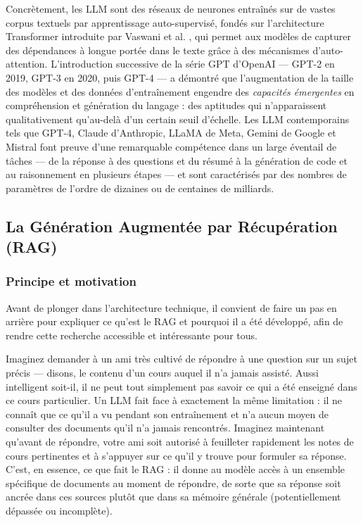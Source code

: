 \documentclass[a4paper,11pt]{article}
\begin{document}
Concrètement, les LLM sont des réseaux de neurones entraînés sur de vastes
corpus textuels par apprentissage auto-supervisé, fondés sur l'architecture
Transformer introduite par Vaswani et al. \cite{vaswani2017attention}, qui
permet aux modèles de capturer des dépendances à longue portée dans le texte
grâce à des mécanismes d'auto-attention. L'introduction successive de la
série GPT d'OpenAI --- GPT-2 en 2019, GPT-3 en 2020, puis GPT-4 ---
a démontré que l'augmentation de la taille des modèles et des données
d'entraînement engendre des \emph{capacités émergentes} en compréhension
et génération du langage \cite{wei2022emergent} : des aptitudes qui
n'apparaissent qualitativement qu'au-delà d'un certain seuil d'échelle.
Les LLM contemporains tels que GPT-4, Claude d'Anthropic, LLaMA de Meta,
Gemini de Google et Mistral font preuve d'une remarquable compétence dans
un large éventail de tâches --- de la réponse à des questions et du résumé
à la génération de code et au raisonnement en plusieurs étapes --- et sont
caractérisés par des nombres de paramètres de l'ordre de dizaines ou de
centaines de milliards.

\subsection{La Génération Augmentée par Récupération (RAG)}

\subsubsection{Principe et motivation}

Avant de plonger dans l'architecture technique, il convient de faire un
pas en arrière pour expliquer ce qu'est le RAG et pourquoi il a été
développé, afin de rendre cette recherche accessible et intéressante
pour tous.

Imaginez demander à un ami très cultivé de répondre à une question sur
un sujet précis --- disons, le contenu d'un cours auquel il n'a jamais
assisté. Aussi intelligent soit-il, il ne peut tout simplement pas savoir
ce qui a été enseigné dans ce cours particulier. Un LLM fait face à
exactement la même limitation : il ne connaît que ce qu'il a vu pendant
son entraînement et n'a aucun moyen de consulter des documents qu'il n'a
jamais rencontrés. Imaginez maintenant qu'avant de répondre, votre ami soit
autorisé à feuilleter rapidement les notes de cours pertinentes et à
s'appuyer sur ce qu'il y trouve pour formuler sa réponse. C'est,
en essence, ce que fait le RAG : il donne au modèle accès à un ensemble
spécifique de documents au moment de répondre, de sorte que sa réponse
soit ancrée dans ces sources plutôt que dans sa mémoire générale
(potentiellement dépassée ou incomplète).
\end{document}
